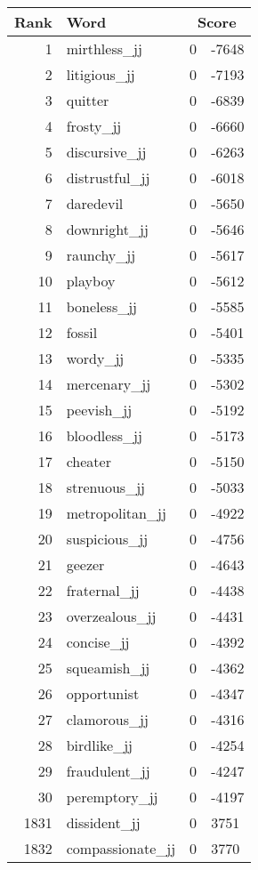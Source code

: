 \begin{longtable}[!htbp]{| rlr@{.}l |}
    \hline
    \textbf{Rank} & \textbf{Word} & \multicolumn{2}{c|}{\textbf{Score}} \\
    \hline
    \endhead
    1 & mirthless\_jj & 0 & -7648 \\
    2 & litigious\_jj & 0 & -7193 \\
    3 & quitter & 0 & -6839 \\
    4 & frosty\_jj & 0 & -6660 \\
    5 & discursive\_jj & 0 & -6263 \\
    6 & distrustful\_jj & 0 & -6018 \\
    7 & daredevil & 0 & -5650 \\
    8 & downright\_jj & 0 & -5646 \\
    9 & raunchy\_jj & 0 & -5617 \\
    10 & playboy & 0 & -5612 \\
    11 & boneless\_jj & 0 & -5585 \\
    12 & fossil & 0 & -5401 \\
    13 & wordy\_jj & 0 & -5335 \\
    14 & mercenary\_jj & 0 & -5302 \\
    15 & peevish\_jj & 0 & -5192 \\
    16 & bloodless\_jj & 0 & -5173 \\
    17 & cheater & 0 & -5150 \\
    18 & strenuous\_jj & 0 & -5033 \\
    19 & metropolitan\_jj & 0 & -4922 \\
    20 & suspicious\_jj & 0 & -4756 \\
    21 & geezer & 0 & -4643 \\
    22 & fraternal\_jj & 0 & -4438 \\
    23 & overzealous\_jj & 0 & -4431 \\
    24 & concise\_jj & 0 & -4392 \\
    25 & squeamish\_jj & 0 & -4362 \\
    26 & opportunist & 0 & -4347 \\
    27 & clamorous\_jj & 0 & -4316 \\
    28 & birdlike\_jj & 0 & -4254 \\
    29 & fraudulent\_jj & 0 & -4247 \\
    30 & peremptory\_jj & 0 & -4197 \\
    1831 & dissident\_jj & 0 & 3751 \\
    1832 & compassionate\_jj & 0 & 3770 \\

\end{longtable}
